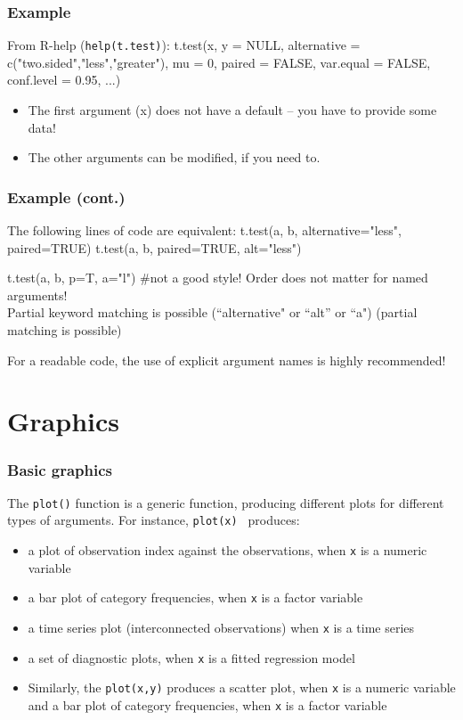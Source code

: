 \documentclass{beamer}
\newcommand{\code}[1]{\texttt{#1}}
\let\overbatim\verbatim
\let\endoverbatim\endverbatim
\newenvironment{vcode}%
{\bgroup\baselineskip=0.8\baselineskip\overbatim}%
{\endoverbatim\egroup}
\begin{document}
\begin{frame}[fragile]
\frametitle{Example}
From R-help (\code{help(t.test)}):
\begin{vcode}
t.test(x, y = NULL,
   alternative = c("two.sided","less","greater"),
   mu = 0, paired = FALSE, var.equal = FALSE,
   conf.level = 0.95, ...)
\end{vcode}
  \begin{itemize}
\item The first argument (x) does not have a default -- you have to provide some data!
\item The other arguments can be modified, if you need to.
  \end{itemize}
  \end{frame}

\begin{frame}[fragile]
\frametitle{Example (cont.)}
The following lines of code are equivalent:
\begin{vcode}
t.test(a, b,  alternative="less", paired=TRUE)
t.test(a, b, paired=TRUE, alt="less")

t.test(a, b, p=T, a="l")   #not a good style!
\end{vcode}
Order does not matter for named arguments! \\ 
Partial keyword matching is possible (``alternative" or ``alt'' or ``a") (partial matching is possible) 

\alert{For a readable code, the use of explicit argument names is highly recommended!}
\end{frame}

\section{Graphics}
\begin{frame}[fragile]
\frametitle{Basic graphics}
The \code{plot()} function is a generic function, producing different plots for different types of arguments. For instance, \code{plot(x) } produces:
\begin{itemize}
\item a plot of observation index against the observations, when \code{x} is a numeric variable %
\item a bar plot of category frequencies, when \code{x} is a factor variable
\item a time series plot (interconnected observations) when \code{x} is a time series
\item a set of diagnostic plots, when  \code{x} is a fitted regression model
\item Similarly, the \code{plot(x,y)} produces a scatter plot, when \code{x} is a numeric variable
and a bar plot of category frequencies, when \code{x} is a factor variable
\end{itemize}
\end{frame}
\end{document}
